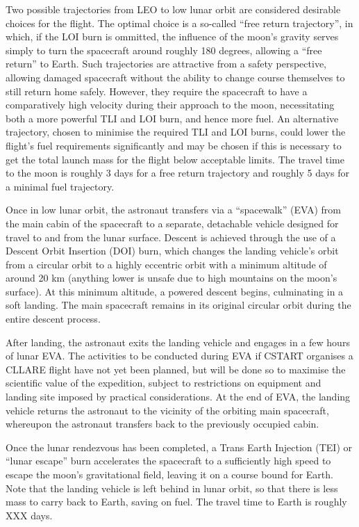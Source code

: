 \documentclass{report}
\begin{document}
Two possible trajectories from LEO to low lunar orbit are considered desirable choices for the flight.  The optimal choice is a so-called ``free return trajectory'', in which, if the LOI burn is ommitted, the influence of the moon's gravity serves simply to turn the spacecraft around roughly 180 degrees, allowing a ``free return'' to Earth.  Such trajectories are attractive from a safety perspective, allowing damaged spacecraft without the ability to change course themselves to still return home safely.  However, they require the spacecraft to have a comparatively high velocity during their approach to the moon, necessitating both a more powerful TLI and LOI burn, and hence more fuel.  An alternative trajectory, chosen to minimise the required TLI and LOI burns, could lower the flight's fuel requirements significantly and may be chosen if this is necessary to get the total launch mass for the flight below acceptable limits.  The travel time to the moon is roughly 3 days for a free return trajectory and roughly 5 days for a minimal fuel trajectory.

Once in low lunar orbit, the astronaut transfers via a ``spacewalk'' (EVA) from the main cabin of the spacecraft to a separate, detachable vehicle designed for travel to and from the lunar surface.  Descent is achieved through the use of a Descent Orbit Insertion (DOI) burn, which changes the landing vehicle's orbit from a circular orbit to a highly eccentric orbit with a minimum altitude of around 20 km (anything lower is unsafe due to high mountains on the moon's surface).  At this minimum altitude, a powered descent begins, culminating in a soft landing.  The main spacecraft remains in its original circular orbit during the entire descent process.

After landing, the astronaut exits the landing vehicle and engages in a few hours of lunar EVA.  The activities to be conducted during EVA if CSTART organises a CLLARE flight have not yet been planned, but will be done so to maximise the scientific value of the expedition, subject to restrictions on equipment and landing site imposed by practical considerations.  At the end of EVA, the landing vehicle returns the astronaut to the vicinity of the orbiting main spacecraft, whereupon the astronaut transfers back to the previously occupied cabin.

Once the lunar rendezvous has been completed, a Trans Earth Injection (TEI) or ``lunar escape'' burn accelerates the spacecraft to a sufficiently high speed to escape the moon's gravitational field, leaving it on a course bound for Earth.  Note that the landing vehicle is left behind in lunar orbit, so that there is less mass to carry back to Earth, saving on fuel.  The travel time to Earth is roughly XXX days. 
\end{document}
